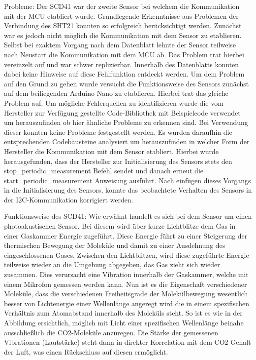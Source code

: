 \documentclass[]{article}
\begin{document}
		Probleme:
		Der SCD41 war der zweite Sensor bei welchem die Kommunikation mit der MCU etabliert wurde. Grundlegende Erkenntnisse aus Problemen der Verbindung des SHT21 konnten so erfolgreich berücksichtigt werden. Zunächst war es jedoch nicht möglich die Kommunikation mit dem Sensor zu etablieren. Selbst bei exaktem Vorgang nach dem Datenblatt lehnte der Sensor teilweise nach Neustart die Kommunikation mit dem MCU ab. Das Problem trat hierbei vereinzelt auf und war schwer replizierbar. Innerhalb des Datenblatts konnten dabei keine Hinweise auf diese Fehlfunktion entdeckt werden. Um dem Problem auf den Grund zu gehen wurde versucht die Funktionsweise des Sensors zunächst auf dem beiliegenden Arduino Nano zu etablieren. Hierbei trat das gleiche Problem auf. Um mögliche Fehlerquellen zu identifizieren wurde die vom Hersteller zur Verfügung gestellte Code-Bibliothek mit Beispielcode verwendet um herauszufinden ob hier ähnliche Probleme zu erkennen sind. Bei Verwendung dieser konnten keine Probleme festgestellt werden. Es wurden daraufhin die entsprechenden Codebausteine analysiert um herauszufinden in welcher Form der Hersteller die Kommunikation mit dem Sensor etabliert. Hierbei wurde herausgefunden, dass der Hersteller zur Initialisierung des Sensors stets den stop\_periodic\_measurement Befehl sendet und danach erneut die start\_periodic\_measurement Anweisung ausführt. Nach einfügen dieses Vorgangs in die Initialisierung des Sensors, konnte das beobachtete Verhalten des Sensors in der I2C-Kommunikation korrigiert werden. 
		
		Funktionsweise des SCD41:
		Wie erwähnt handelt es sich bei dem Sensor um einen photoakustischen Sensor. Bei diesem wird über kurze Lichtblitze dem Gas in einer Gaskammer Energie zugeführt. Diese Energie führt zu einer Steigerung der thermischen Bewegung der Moleküle und damit zu einer Ausdehnung des eingeschlossenen Gases. Zwischen den Lichtblitzen, wird diese zugeführte Energie teilweise wieder an die Umgebung abgegeben, das Gas zieht sich wieder zusammen. Dies verursacht eine Vibration innerhalb der Gaskammer, welche mit einem Mikrofon gemessen werden kann. Nun ist es die Eigenschaft verschiedener Moleküle, dass die verschiedenen Freiheitsgrade der Molekülbewegung wesentlich besser von Lichtenergie einer Wellenlänge angeregt wird die in einem spezifischen Verhältnis zum Atomabstand innerhalb des Moleküls steht. So ist es wie in der Abbildung ersichtlich, möglich mit Licht einer spezifischen Wellenlänge beinahe ausschließlich die CO2-Moleküle anzuregen. Die Stärke der gemessenen Vibrationen (Lautstärke) steht dann in direkter Korrelation mit dem CO2-Gehalt der Luft, was einen Rückschluss auf diesen ermöglicht.
		
\end{document}
